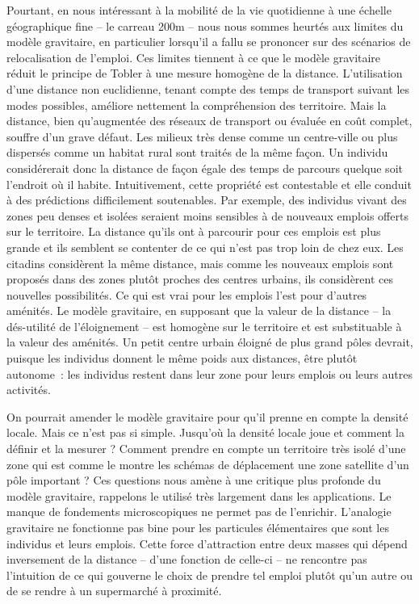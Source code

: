 \documentclass[
  10pt,
  a4paper,
  numbers=noendperiod,
  DIV=9]{scrreprt}
\begin{document}
Pourtant, en nous intéressant à la mobilité de la vie quotidienne à une
échelle géographique fine -- le carreau 200m -- nous nous sommes heurtés
aux limites du modèle gravitaire, en particulier lorsqu'il a fallu se
prononcer sur des scénarios de relocalisation de l'emploi. Ces limites
tiennent à ce que le modèle gravitaire réduit le principe de Tobler à
une mesure homogène de la distance. L'utilisation d'une distance non
euclidienne, tenant compte des temps de transport suivant les modes
possibles, améliore nettement la compréhension des territoire. Mais la
distance, bien qu'augmentée des réseaux de transport ou évaluée en coût
complet, souffre d'un grave défaut. Les milieux très dense comme un
centre-ville ou plus dispersés comme un habitat rural sont traités de la
même façon. Un individu considérerait donc la distance de façon égale
des temps de parcours quelque soit l'endroit où il habite.
Intuitivement, cette propriété est contestable et elle conduit à des
prédictions difficilement soutenables. Par exemple, des individus vivant
des zones peu denses et isolées seraient moins sensibles à de nouveaux
emplois offerts sur le territoire. La distance qu'ils ont à parcourir
pour ces emplois est plus grande et ils semblent se contenter de ce qui
n'est pas trop loin de chez eux. Les citadins considèrent la même
distance, mais comme les nouveaux emplois sont proposés dans des zones
plutôt proches des centres urbains, ils considèrent ces nouvelles
possibilités. Ce qui est vrai pour les emplois l'est pour d'autres
aménités. Le modèle gravitaire, en supposant que la valeur de la
distance -- la dés-utilité de l'éloignement -- est homogène sur le
territoire et est substituable à la valeur des aménités. Un petit centre
urbain éloigné de plus grand pôles devrait, puisque les individus
donnent le même poids aux distances, être plutôt autonome~: les
individus restent dans leur zone pour leurs emplois ou leurs autres
activités.

On pourrait amender le modèle gravitaire pour qu'il prenne en compte la
densité locale. Mais ce n'est pas si simple. Jusqu'où la densité locale
joue et comment la définir et la mesurer ? Comment prendre en compte un
territoire très isolé d'une zone qui est comme le montre les schémas de
déplacement une zone satellite d'un pôle important ? Ces questions nous
amène à une critique plus profonde du modèle gravitaire, rappelons le
utilisé très largement dans les applications. Le manque de fondements
microscopiques ne permet pas de l'enrichir. L'analogie gravitaire ne
fonctionne pas bine pour les particules élémentaires que sont les
individus et leurs emplois. Cette force d'attraction entre deux masses
qui dépend inversement de la distance -- d'une fonction de celle-ci --
ne rencontre pas l'intuition de ce qui gouverne le choix de prendre tel
emploi plutôt qu'un autre ou de se rendre à un supermarché à proximité.
\end{document}

